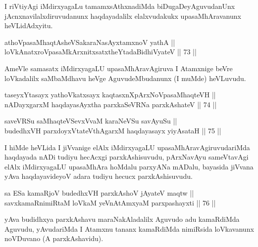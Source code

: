 \begin{artha}
I riVtiyAgi iMdirxyagaLu tamamxsAthxnadiMda biDugaDeyAguvudanUnx
jAcnxnavilalxdiruvudanunx haqdayadalilx elalxvudakukx upasaMhAravanunx
heVLidAdxyitu.
\end{artha}

\begin{shl}
athoVpasaMhaqtAsheVSakaraNasAyx\s \s tamxnoV yathA || \\
loVkAnatxroVpasaMkArxnitxsatxtheYtadaBidhiVyateV \hfill || 73 ||  
\end{shl}

\begin{artha}
AmeVle samasatx iMdirxyagaLU upasaMhAravAgiruva I Atamxnige beVre
loVkadalilx saMbaMdhavu heVge AguvudeMbudanunx (I muMde) heVLuvudu.
\end{artha}


\begin{shl}
taseyxYtasayx yathoVkatxsayx kaqtasxnXpArxNoVpasaMhaqteVH || \\
nADayxgarxM haqdayasAyxtha parxkaSeVRNa parxkAshateV \hfill || 74 ||  
\end{shl}

\begin{shl}
saveVRSu saMhaqteVSevxVvaM karaNeVSu savAyuSu ||  \\
budedhxVH parxdoyxVtateV\s thAgarxM haqdayasayx yiyAsataH \hfill || 75 ||  
\end{shl}

\begin{artha}
I hiMde heVLida I jiVvanige elAlx iMdirxyagaLU
upasaMhAravAgiruvudariMda haqdayada nADi tudiyu hecAcxgi
parxkAshisuvudu, pArxNavAyu sameVtavAgi elAlx iMdirxyagaLU upasaMhAra
hoMdalu parxyANa mADalu, bayasida jiVvana yAva haqdayavideyoV adara
tudiyu hecucx parxkAshisuvudu.
\end{artha}


\begin{shl}
sa ESa kamaRjoV budedhxVH parxkAshoV jAyateV maqtw || \\
savxkamaRnimiRtaM loVkaM yeVnA\s \s tAmx\s yaM parxpashayxti \hfill || 76 ||  
\end{shl}

\begin{artha}
yAva budidhxya parxkAshavu maraNakAladalilx Aguvudo adu kamaRdiMda
Aguvudu, yAvudariMda I Atamxnu tananx kamaRdiMda nimiRsida loVkavanunx
noVDuvano (A parxkAshavidu).
\end{artha}

